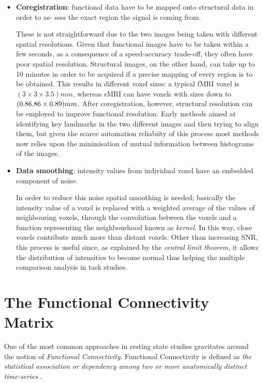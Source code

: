 \documentclass[12pt,openright,twoside,a4paper]{book}
\begin{document}
\begin{itemize}
\item \textbf{Coregistration}: functional data have to be mapped onto structural data in order to as- sess the exact region the signal is coming from. 

These is not straightforward due to the two images being taken with different spatial resolutions. Given that functional images have to be taken within a few seconds, as a consequence of a speed-accuracy trade-off, they often have poor spatial resolution. 
Structural images, on the other hand, can take up to 10 minutes in order to be acquired if a precise mapping of every region is to be obtained.
This results in different voxel sizes: a typical fMRI voxel is $(3\times 3\times 3.5) mm$, whereas sMRI can have voxels with sizes down to $(0.86\time 0.86\times 0.89) mm$. 
After coregistration, however, structural resolution can be employed to improve functional resolution. 
Early methods aimed at identifying key landmarks in the two different images and then trying to align them, but given the scarce automation reliabiity of this process most methods now relies upon the minimisation of mutual information between histograms of the images.

\item \textbf{Data smoothing}: intensity values from individual voxel have an embedded component of noise. 

In order to reduce this noise spatial smoothing is needed; basically the intensity value of a voxel is replaced with a weighted average of the values of neighbouring voxels, through the convolution between the voxels and a function representing the neighbourhood known as \textit{kernel}. 
In this way, close voxels contribute much more than distant voxels. 
Other than increasing SNR, this process is useful since, as explained by the \textit{central limit theorem}, it allows the distribution of intensities to become normal thus helping the multiple comparison analysis in task studies.


\end{itemize}

\section{The Functional Connectivity Matrix}

One of the most common approaches in resting state studies gravitates around the notion of \textit{Functional Connectivity}.
Functional Connectivity is defined as \textit{the statistical association or dependency among two or more anatomically distinct time-series} \cite{connect}.
\end{document}

